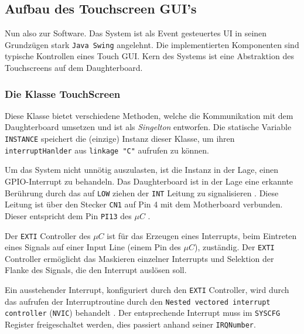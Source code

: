 \subsection{Aufbau des Touchscreen GUI's}
	Nun also zur Software. 
	Das System ist als Event gesteuertes UI in seinen Grundzügen stark \texttt{Java Swing} angelehnt.
	Die implementierten Komponenten sind typische Kontrollen eines Touch GUI.
	Kern des Systems ist eine Abstraktion des Touchscreens auf dem Daughterboard.
	
	\subsubsection{Die Klasse TouchScreen}\label{sec:touchscreen_class}
		\begin{figure}
			\scalebox{0.75}{
				\begin{tikzpicture}
					
				\end{tikzpicture}
			}
		\end{figure}
		Diese Klasse bietet verschiedene Methoden, welche die Kommunikation mit dem Daughterboard umsetzen und ist als \emph{Singelton} entworfen.
		Die statische Variable \texttt{INSTANCE} speichert die (einzige) Instanz dieser Klasse, um ihren \texttt{interruptHanlder} aus \texttt{linkage "C"} aufrufen zu können.
		
		Um das System nicht unnötig auszulasten, ist die Instanz in der Lage, einen GPIO-Interrupt zu behandeln.
		Das Daughterboard ist in der Lage eine erkannte Berührung durch das auf \texttt{LOW} ziehen der \texttt{INT} Leitung zu signalisieren \cite[8\psq]{ts-userManual}.
		Diese Leitung ist über den Stecker \texttt{CN1} auf Pin 4 mit dem Motherboard verbunden. Dieser entspricht dem Pin \texttt{PI13} des $\mu C$ \cite[27\psq]{disco-userManual}.
		
		Der \texttt{EXTI} Controller des $\mu C$ ist für das Erzeugen eines Interrupts, beim Eintreten eines Signals auf einer Input Line (einem Pin des $\mu C$), zuständig.
		Der \texttt{EXTI} Controller ermöglicht das Maskieren einzelner Interrupts und Selektion der Flanke des Signals, die den Interrupt auslösen soll. \cite[319\psqq]{stm32_refManual}
		
		Ein ausstehender Interrupt, konfiguriert durch den \texttt{EXTI} Controller, wird durch das aufrufen der Interruptroutine durch den \texttt{Nested vectored interrupt controller} (\texttt{NVIC}) behandelt \cite[313\psqq]{stm32_refManual}.
		Der entsprechende Interrupt muss im \texttt{SYSCFG} Register freigeschaltet werden, dies passiert anhand seiner \texttt{IRQNumber}.
		
